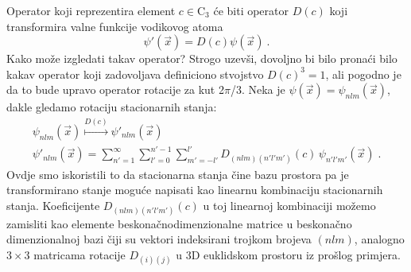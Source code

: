 \begin{primjer}

Operator koji reprezentira element $c\in\mathrm{C}_3$ će biti
operator $D(c)$ koji transformira valne funkcije vodikovog atoma
\begin{equation}
\psi'(\vec{x})=D(c)\psi(\vec{x}) \:.
\end{equation}
Kako može izgledati takav operator? Strogo uzevši, dovoljno bi bilo pronaći
bilo kakav
operator koji zadovoljava definiciono stvojstvo $D(c)^3 = 1$, ali
pogodno je da to bude upravo operator rotacije za kut 2$\pi$/3.
Neka je $\psi(\vec{x})=\psi_{nlm}(\vec{x})$, dakle gledamo rotaciju
stacionarnih stanja:
\begin{gather}
\psi_{nlm}(\vec{x}) \stackrel{D(c)}{\mapsto}  \psi'_{nlm}(\vec{x}) \\
   \psi'_{nlm}(\vec{x}) = \sum_{n'=1}^{\infty}\sum_{l'=0}^{n'-1}
  \sum_{m'=-l'}^{l'}  D_{(nlm)(n'l'm')}(c)\,  \psi_{n'l'm'}(\vec{x}) \;. 
  \label{eq:nlmexp}
\end{gather}
Ovdje smo iskoristili to da stacionarna stanja čine bazu prostora pa je
transformirano stanje moguće napisati kao linearnu kombinaciju stacionarnih
stanja. Koeficijente $D_{(nlm)(n'l'm')}(c)$ u toj linearnoj kombinaciji
možemo zamisliti kao elemente beskonačnodimenzionalne matrice u beskonačno
dimenzionalnoj bazi čiji su vektori indeksirani trojkom brojeva $(nlm)$, analogno
$3\times 3$ matricama rotacije $D_{(i)(j)}$ u 3D euklidskom prostoru iz prošlog
primjera.


\end{primjer}
